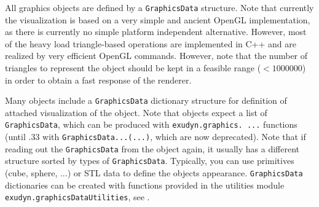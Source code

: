 \newpage %
All graphics objects are defined by a \texttt{GraphicsData} structure. %
Note that currently the visualization is based on a very simple and ancient OpenGL implementation, as there is currently no simple platform independent alternative. However, most of the heavy load triangle-based operations are implemented in C++ and are realized by very efficient OpenGL commands. However, note that the number of triangles to represent the object should be kept in a feasible range ($<1000000$) in order to obtain a fast response of the renderer.

Many objects include a \texttt{GraphicsData} dictionary structure for definition of attached visualization of the object.
Note that objects expect a list of \texttt{GraphicsData}, which can be produced with \texttt{exudyn.graphics. ...} functions (until .33 with \texttt{GraphicsData...(...)}, which are now deprecated). 
Note that if reading out the \texttt{GraphicsData} from the object again, it usually has a different structure sorted by types of \texttt{GraphicsData}.
Typically, you can use primitives (cube, sphere, ...) or \ac{STL} data to define the objects appearance.
\texttt{GraphicsData} dictionaries can be created with functions provided in the utilities module \texttt{exudyn.graphicsDataUtilities}, see .

